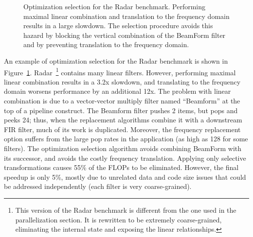 
\begin{figure}[t!]
\vspace{-0.07in}
\centering
{}
\caption[Optimization selection for the Radar benchmark]{Optimization
selection for the Radar benchmark.  Performing maximal linear
combination and translation to the frequency domain results in a large
slowdown.  The selection procedure avoids this hazard by blocking the
vertical combination of the BeamForm filter and by preventing
translation to the frequency domain.\protect\label{fig:radar}}
\end{figure}

An example of optimization selection for the Radar benchmark is shown
in Figure~\ref{fig:radar}.  Radar~\footnote{This version of the Radar
benchmark is different from the one used in the parallelization
section.  It is rewritten to be extremely coarse-grained, eliminating
the internal state and exposing the linear relationships.} contains
many linear filters.  However, performing maximal linear combination
results in a 3.2x slowdown, and translating to the frequency domain
worsens performance by an additional 12x.  The problem with linear
combination is due to a vector-vector multiply filter named
``Beamform'' at the top of a pipeline construct.  The Beamform filter
pushes 2 items, but pops and peeks 24; thus, when the replacement
algorithms combine it with a downstream FIR filter, much of its work
is duplicated.  Moreover, the frequency replacement option suffers
from the large pop rates in the application (as high as 128 for some
filters).  The optimization selection algorithm avoids combining
BeamForm with its successor, and avoids the costly frequency
translation.  Applying only selective transformations causes 55\% of
the FLOPs to be eliminated.  However, the final speedup is only 5\%,
mostly due to unrelated data and code size issues that could be
addressed independently (each filter is very coarse-grained).

